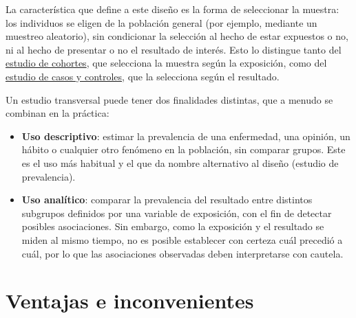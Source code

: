 \documentclass[
  spanish,
  a4paper,
]{scrreport}
\providecommand{\tightlist}{%
  \setlength{\itemsep}{0pt}\setlength{\parskip}{0pt}}
\theoremstyle{definition}
\theoremstyle{definition}
\theoremstyle{remark}
\begin{document}
La característica que define a este diseño es la forma de seleccionar la
muestra: los individuos se eligen de la población general (por ejemplo,
mediante un muestreo aleatorio), sin condicionar la selección al hecho
de estar expuestos o no, ni al hecho de presentar o no el resultado de
interés. Esto lo distingue tanto del
\href{04-estudios-cohortes.qmd}{estudio de cohortes}, que selecciona la
muestra según la exposición, como del
\href{05-estudios-casos-controles.qmd}{estudio de casos y controles},
que la selecciona según el resultado.

Un estudio transversal puede tener dos finalidades distintas, que a
menudo se combinan en la práctica:

\begin{itemize}
\tightlist
\item
  \textbf{Uso descriptivo}: estimar la prevalencia de una enfermedad,
  una opinión, un hábito o cualquier otro fenómeno en la población, sin
  comparar grupos. Este es el uso más habitual y el que da nombre
  alternativo al diseño (estudio de prevalencia).
\item
  \textbf{Uso analítico}: comparar la prevalencia del resultado entre
  distintos subgrupos definidos por una variable de exposición, con el
  fin de detectar posibles asociaciones. Sin embargo, como la exposición
  y el resultado se miden al mismo tiempo, no es posible establecer con
  certeza cuál precedió a cuál, por lo que las asociaciones observadas
  deben interpretarse con cautela.
\end{itemize}

\section{Ventajas e inconvenientes}\label{ventajas-e-inconvenientes-1}
\end{document}

